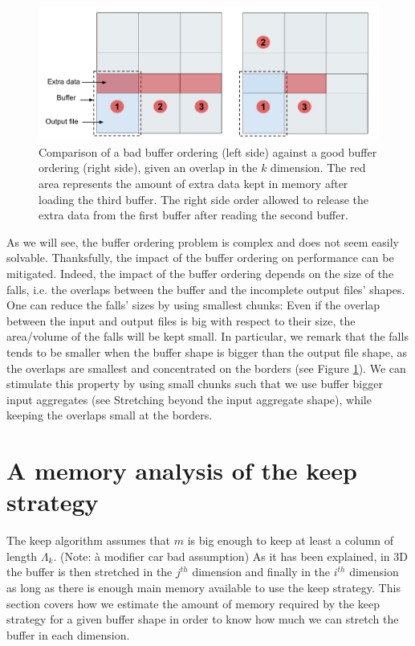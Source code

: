 \documentclass[conference]{IEEEtran}
\begin{document}
\begin{figure}[h]
\includegraphics[scale=0.2]{./figures/goodorderingbadordering.png}
\caption{ Comparison of a bad buffer ordering (left side) against a good buffer ordering (right side), given an overlap in the $k$ dimension.
The red area represents the amount of extra data kept in memory after loading the third buffer.
The right side order allowed to release the extra data from the first buffer after reading the second buffer.
}
\label{fig:goodorderingbadordering}
\end{figure}

As we will see, the buffer ordering problem is complex and does not seem easily solvable.
Thanksfully, the impact of the buffer ordering on performance can be mitigated.
Indeed, the impact of the buffer ordering depends on the size of the falls, i.e. the overlaps between the buffer and the incomplete output files' shapes.
One can reduce the falls' sizes by using smallest chunks:
Even if the overlap between the input and output files is big with respect to their size, the area/volume of the falls will be kept small.
In particular, we remark that the falls tends to be smaller when the buffer shape is bigger than the output file shape, as the overlaps are smallest and concentrated on the borders (see Figure \ref{fig:goodorderingbadordering}).
We can stimulate this property by using small chunks such that we use buffer bigger input aggregates (see Stretching beyond the input aggregate shape), while keeping the overlaps small at the borders.

\section*{A memory analysis of the keep strategy}
The keep algorithm assumes that $m$ is big enough to keep at least a column of length $\Lambda_k$. (Note: à modifier car bad assumption) %
As it has been explained, in 3D the buffer is then stretched in the $j^{th}$ dimension and finally in the $i^{th}$ dimension as long as there is enough main memory available to use the keep strategy.
This section covers how we estimate the amount of memory required by the keep strategy for a given buffer shape in order to know how much we can stretch the buffer in each dimension. \\
\end{document}
